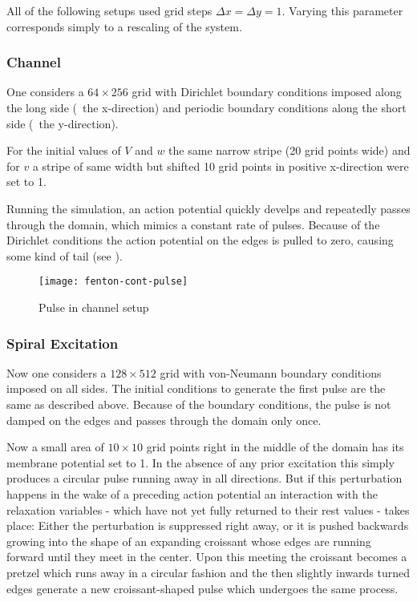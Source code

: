 All of the following setups used grid steps $\Delta{x}=\Delta{y}=1$. Varying
this parameter corresponds simply to a rescaling of the system.


\subsubsection{Channel}
\label{sec:channel}
One considers a $64\times256$ grid with Dirichlet boundary conditions imposed
along the long side (\ie~the x-direction) and periodic boundary conditions
along the short side (\ie~the y-direction).

For the initial values of $V$ and $w$ the same narrow stripe (20 grid points
wide) and for $v$ a stripe of same width but shifted 10 grid points in positive
x-direction were set to 1.

Running the simulation, an action potential quickly develps and repeatedly
passes through the domain, which mimics a constant rate of pulses. Because of
the Dirichlet conditions the action potential on the edges is pulled to zero,
causing some kind of tail (see ).

\begin{figure}[h]
    \centering
    \texttt{[image: fenton-cont-pulse]}
    \caption{Pulse in channel setup}
    \label{fig:pulse}
\end{figure}


\subsubsection{Spiral Excitation}
\label{sec:spiral1}
Now one considers a $128\times512$ grid with von-Neumann boundary conditions
imposed on all sides. The initial conditions to generate the first pulse are
the same as described above. Because of the boundary conditions, the pulse is
not damped on the edges and passes through the domain only once.

Now a small area of $10\times10$ grid points right in the middle of the domain
has its membrane potential set to 1. In the absence of any prior excitation
this simply produces a circular pulse running away in all directions. But if
this perturbation happens in the wake of a preceding action potential an
interaction with the relaxation variables - which have not yet fully returned
to their rest values - takes place: Either the perturbation is suppressed right
away, or it is pushed backwards growing into the shape of an expanding
croissant whose edges are running forward until they meet in the
center. Upon this meeting the croissant becomes a pretzel which runs away in a
circular fashion and the then slightly inwards turned edges generate a new
croissant-shaped pulse which undergoes the same process.

